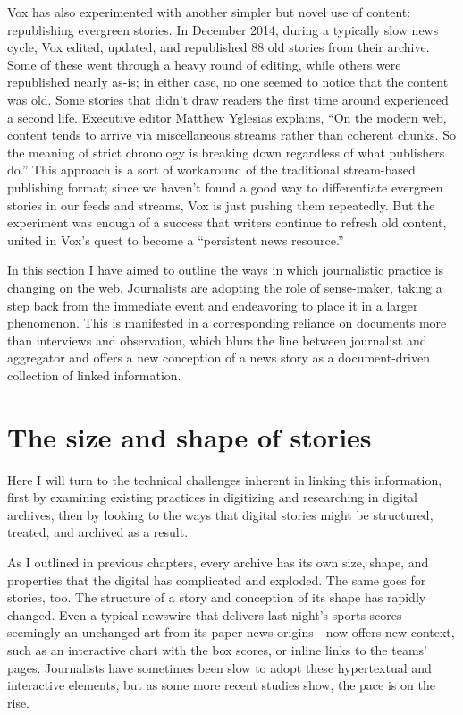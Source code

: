 Vox has also experimented with another simpler but novel use of content: republishing evergreen stories. In December 2014, during a typically slow news cycle, Vox edited, updated, and republished 88 old stories from their archive.\autocite{yglesias_refreshing_2015} Some of these went through a heavy round of editing, while others were republished nearly as-is; in either case, no one seemed to notice that the content was old. Some stories that didn't draw readers the first time around experienced a second life. Executive editor Matthew Yglesias explains, ``On the modern web, content tends to arrive via miscellaneous streams rather than coherent chunks. So the meaning of strict chronology is breaking down regardless of what publishers do.''\autocite{yglesias_refreshing_2015} This approach is a sort of workaround of the traditional stream-based publishing format; since we haven't found a good way to differentiate evergreen stories in our feeds and streams, Vox is just pushing them repeatedly. But the experiment was enough of a success that writers continue to refresh old content, united in Vox's quest to become a ``persistent news resource.''\autocite{yglesias_refreshing_2015}

In this section I have aimed to outline the ways in which journalistic practice is changing on the web. Journalists are adopting the role of sense-maker, taking a step back from the immediate event and endeavoring to place it in a larger phenomenon. This is manifested in a corresponding reliance on documents more than interviews and observation, which blurs the line between journalist and aggregator and offers a new conception of a news story as a document-driven collection of linked information.

\section{The size and shape of stories}

Here I will turn to the technical challenges inherent in linking this information, first by examining existing practices in digitizing and researching in digital archives, then by looking to the ways that digital stories might be structured, treated, and archived as a result. 

As I outlined in previous chapters, every archive has its own size, shape, and properties that the digital has complicated and exploded. The same goes for stories, too. The structure of a story and conception of its shape has rapidly changed. Even a typical newswire that delivers last night's sports scores---seemingly an unchanged art from its paper-news origins---now offers new context, such as an interactive chart with the box scores, or inline links to the teams' pages. Journalists have sometimes been slow to adopt these hypertextual and interactive elements, but as some more recent studies show, the pace is on the rise.\autocites[See, e.g.,][]{coddington_building_2012}{coddington_normalizing_2014}{larsson_staying_2013}

